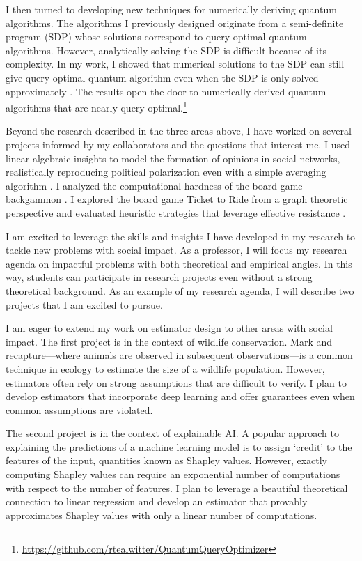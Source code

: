 \documentclass[11pt]{article}
\begin{document}
I then turned to developing new techniques for numerically deriving quantum algorithms.
The algorithms I previously designed originate from a semi-definite program (SDP) whose solutions correspond to query-optimal quantum algorithms.
However, analytically solving the SDP is difficult because of its complexity.
In my work, I showed that numerical solutions to the SDP can still give query-optimal quantum algorithm even when the SDP is only solved approximately \cite{czekanski2023robust}.
The results open the door to numerically-derived quantum algorithms that are nearly query-optimal.\footnote{\url{https://github.com/rtealwitter/QuantumQueryOptimizer}}

Beyond the research described in the three areas above, I have worked on several projects informed by my collaborators and the questions that interest me.
I used linear algebraic insights to model the formation of opinions in social networks, realistically reproducing political polarization even with a simple averaging algorithm \cite{musco2022quantify}.
I analyzed the computational hardness of the board game backgammon \cite{witter2021backgammon}.
I explored the board game Ticket to Ride from a graph theoretic perspective and evaluated heuristic strategies that leverage effective resistance \cite{witter2020applications}.


I am excited to leverage the skills and insights I have developed in my research to tackle new problems with social impact.
As a professor, I will focus my research agenda on impactful problems with both theoretical and empirical angles.
In this way, students can participate in research projects even without a strong theoretical background.
As an example of my research agenda, I will describe two projects that I am excited to pursue.

I am eager to extend my work on estimator design to other areas with social impact.
The first project is in the context of wildlife conservation.
Mark and recapture---where animals are observed in subsequent observations---is a common technique in ecology to estimate the size of a wildlife population.
However, estimators often rely on strong assumptions that are difficult to verify.
I plan to develop estimators that incorporate deep learning and offer guarantees even when common assumptions are violated.

The second project is in the context of explainable AI.
A popular approach to explaining the predictions of a machine learning model is to assign `credit' to the features of the input, quantities known as Shapley values.
However, exactly computing Shapley values can require an exponential number of computations with respect to the number of features.
I plan to leverage a beautiful theoretical connection to linear regression and develop an estimator that provably approximates Shapley values with only a linear number of computations.
\end{document}
